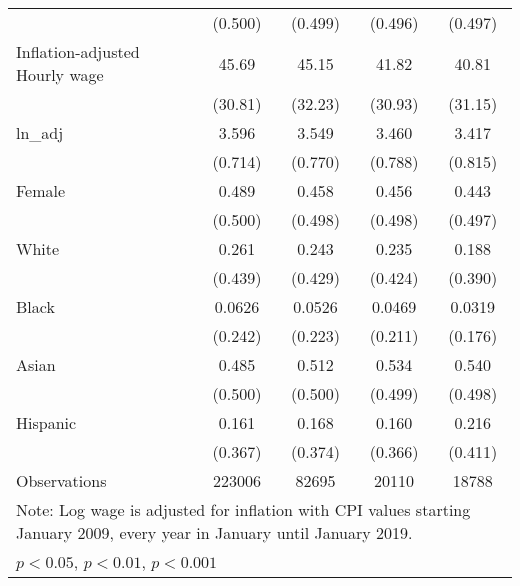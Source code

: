 \begin{table}[htbp]
\begin{tabular}{l*{4}{c}}
                    &     (0.500)         &     (0.499)         &     (0.496)         &     (0.497)         \\
[1em]
Inflation-adjusted Hourly wage&       45.69         &       45.15         &       41.82         &       40.81         \\
                    &     (30.81)         &     (32.23)         &     (30.93)         &     (31.15)         \\
[1em]
ln\_adj              &       3.596         &       3.549         &       3.460         &       3.417         \\
                    &     (0.714)         &     (0.770)         &     (0.788)         &     (0.815)         \\
[1em]
Female              &       0.489         &       0.458         &       0.456         &       0.443         \\
                    &     (0.500)         &     (0.498)         &     (0.498)         &     (0.497)         \\
[1em]
White               &       0.261         &       0.243         &       0.235         &       0.188         \\
                    &     (0.439)         &     (0.429)         &     (0.424)         &     (0.390)         \\
[1em]
Black               &      0.0626         &      0.0526         &      0.0469         &      0.0319         \\
                    &     (0.242)         &     (0.223)         &     (0.211)         &     (0.176)         \\
[1em]
Asian               &       0.485         &       0.512         &       0.534         &       0.540         \\
                    &     (0.500)         &     (0.500)         &     (0.499)         &     (0.498)         \\
[1em]
Hispanic            &       0.161         &       0.168         &       0.160         &       0.216         \\
                    &     (0.367)         &     (0.374)         &     (0.366)         &     (0.411)         \\
\hline
Observations        &      223006         &       82695         &       20110         &       18788         \\
\hline\hline
\multicolumn{5}{l}{\footnotesize Note: Log wage is adjusted for inflation with CPI values starting January 2009, every year in January until January 2019.}\\
\multicolumn{5}{l}{\footnotesize \sym{*} \(p<0.05\), \sym{**} \(p<0.01\), \sym{***} \(p<0.001\)}\\
\end{tabular}
\end{table}
